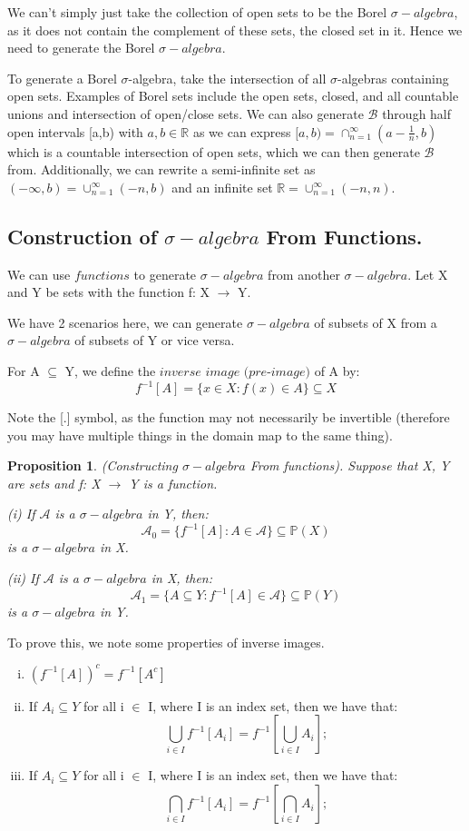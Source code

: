 \documentclass[twoside]{article}
\newtheorem{proposition}[theorem]{Proposition}
\newcommand{\sa}{\sigma-algebra}
\begin{document}
We can't simply just take the collection of open sets to be the Borel $\sa$, as it does not contain the complement of these sets, the closed set in it. Hence we need to generate the Borel $\sa$.

To generate a Borel $\sigma$-algebra, take the intersection of all $\sigma$-algebras containing open sets. Examples of Borel sets include the open sets, closed, and all countable unions and intersection of open/close sets. We can also generate $\mathcal{B}$ through half open intervals [a,b) with $a, b \in \mathbb{R}$ as we can express 
$
[a,b) = \cap_{n=1}^{\infty}(a-\frac{1}{n}, b)
$
which is a countable intersection of open sets, which we can then generate $\mathcal{B}$ from. Additionally, we can rewrite a semi-infinite set as $(-\infty,b) = \cup_{n=1}^{\infty}(-n,b)$ and an infinite set $\mathbb{R} = \cup_{n=1}^{\infty}(-n,n)$.

\subsection{Construction of $\sa$ From Functions.}

We can use $\textit{functions}$ to generate $\sa$ from another $\sa$. Let X and Y be sets with the function f: X $\rightarrow$ Y. 

We have 2 scenarios here, we can generate $\sa$ of subsets of X from a $\sa$ of subsets of Y or vice versa.

For A $\subseteq$ Y, we define the $\textit{inverse image (pre-image)}$ of A by:
$$
f^{-1}[A] = \{x \in X: f(x) \in A\} \subseteq X
$$

Note the [.] symbol, as the function may not necessarily be invertible (therefore you may have multiple things in the domain map to the same thing).

\begin{proposition}
(Constructing $\sa$ From functions). Suppose that X, Y are sets and f: X $\rightarrow$ Y is a function.

(i) If $\mathcal{A}$ is a $\sa$ in Y, then:
$$
\mathcal{A}_0 = \{f^{-1}[A]: A \in \mathcal{A}\} \subseteq \mathbb{P}(X)
$$
is a $\sa$ in X.

(ii) If $\mathcal{A}$ is a $\sa$ in X, then:
$$
\mathcal{A}_1 = \{A \subseteq Y: f^{-1}[A] \in \mathcal{A}\} \subseteq \mathbb{P}(Y)
$$
is a $\sa$ in Y.
\end{proposition}

To prove this, we note some properties of inverse images.

\begin{enumerate}[(i)]
    \item $(f^{-1}[A])^c = f^{-1}[A^c]$
    \item If $A_i \subseteq Y$ for all i $\in$ I, where I is an index set, then we have that:
    $$
    \bigcup_{i\in I}f^{-1}[A_i] = f^{-1}[\bigcup_{i\in I}A_i];
    $$
    \item If $A_i \subseteq Y$ for all i $\in$ I, where I is an index set, then we have that:
    $$
    \bigcap_{i\in I}f^{-1}[A_i] = f^{-1}[\bigcap_{i\in I}A_i];
    $$

\end{enumerate}
\end{document}
